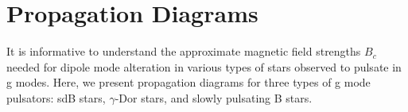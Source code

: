 \appendix


\section{Propagation Diagrams}

It is informative to understand the approximate magnetic field strengths $B_c$ needed for dipole mode alteration in various types of stars observed to pulsate in g modes. Here, we present propagation diagrams for three types of g mode pulsators: sdB stars, $\gamma$-Dor stars, and slowly pulsating B stars. 
